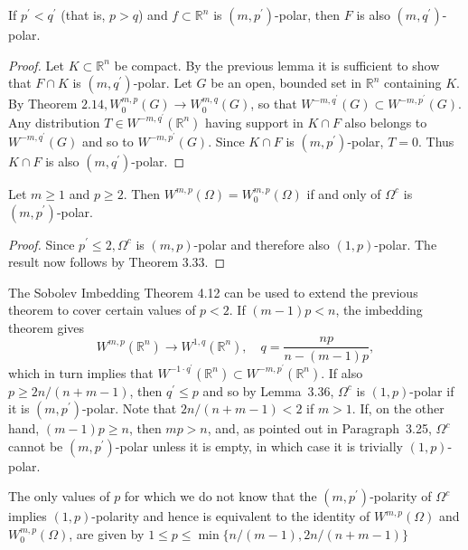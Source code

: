 \begin{lemma}
  If $p^{\prime}<q^{\prime}$ (that is, $p>q$) and $f \subset \mathbb{R}^n$
  is $\left(m, p^{\prime}\right)$-polar, then $F$ is also $\left(m, q^{\prime}\right)$-polar.
\end{lemma}
    
\begin{proof}
  Let $K \subset \mathbb{R}^n$ be compact. By the previous lemma it is sufficient to show that $F \cap K$ is $\left(m, q^{\prime}\right)$-polar. Let $G$ be an open, bounded set in $\mathbb{R}^n$ containing $K$. By Theorem $2.14, W_0^{m, p}(G) \rightarrow W_0^{m, q}(G)$, so that $W^{-m, q^{\prime}}(G) \subset W^{-m, p^{\prime}}(G)$. Any distribution $T \in W^{-m, q^{\prime}}\left(\mathbb{R}^n\right)$ having support in $K \cap F$ also belongs to $W^{-m, q^{\prime}}(G)$ and so to $W^{-m, p^{\prime}}(G)$. Since $K \cap F$ is $\left(m, p^{\prime}\right)$-polar, $T=0$. Thus $K \cap F$ is also $\left(m, q^{\prime}\right)$-polar.
\end{proof}


\begin{theorem}
  Let $m \geq 1$ and $p \geq 2$. Then $W^{m,p}(\Omega)=W_0^{m, p}(\Omega)$ if and only of $\Omega^c$ is $\left(m, p^{\prime}\right)$-polar.
\end{theorem}

\begin{proof}
  Since $p^{\prime} \leq 2, \Omega^c$ is $(m, p)$-polar and therefore also $(1, p)$-polar. The result now follows by Theorem 3.33.
\end{proof}

\begin{para}
  The Sobolev Imbedding Theorem 4.12 can be used to extend the previous theorem to cover certain 
  values of $p<2$. If $(m-1) p<n$, the imbedding theorem gives
  \[
  W^{m, p}\left(\mathbb{R}^n\right) \rightarrow W^{1, q}\left(\mathbb{R}^n\right), \quad q=\frac{n p}{n-(m-1) p},
  \]
  which in turn implies that $W^{-1 \cdot q^{\prime}}\left(\mathbb{R}^n\right) \subset W^{-m, p^{\prime}}\left(\mathbb{R}^n\right)$.
  If also $p \geq 2 n /(n+m-1)$, then $q^{\prime} \leq p$ and so by Lemma~3.36, $\Omega^c$
  is $(1, p)$-polar if it is $\left(m, p^{\prime}\right)$-polar. Note that $2 n /(n+m-1)<2$
  if $m>1$. If, on the other hand, $(m-1) p \geq n$, then $m p>n$, and, as pointed out in 
  Paragraph~3.25, $\Omega^c$ cannot be $\left(m, p^{\prime}\right)$-polar unless it is empty,
  in which case it is trivially $(1, p)$-polar.
  
  The only values of $p$ for which we do not know that the $\left(m, p^{\prime}\right)$-polarity 
  of $\Omega^c$ implies $(1, p)$-polarity and hence is equivalent to the identity of $W^{m,p}(\Omega)$ and $W_0^{m, p}(\Omega)$, are given by $1 \leq p \leq \min \{n /(m-1), 2 n /(n+m-1)\}$
\end{para}

